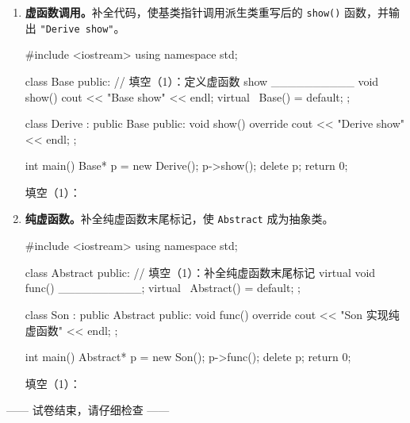 \documentclass[UTF8,fontset=fandol,zihao=-4,a4paper]{ctexart}
\newcommand{\blank}[1][2.4cm]{\underline{\hspace{#1}}}
\newenvironment{questionkeep}
  {\begin{minipage}[t]{\linewidth}}
  {\end{minipage}}
\begin{document}
\begin{enumerate}
  \item
  \begin{questionkeep}
  \textbf{虚函数调用。}补全代码，使基类指针调用派生类重写后的 \texttt{show()} 函数，并输出 \texttt{"Derive show"}。

\begin{cppcode}
#include <iostream>
using namespace std;

class Base {
public:
    // 填空（1）：定义虚函数 show
    __________ void show() {
        cout << "Base show" << endl;
    }
    virtual ~Base() = default;
};

class Derive : public Base {
public:
    void show() override {
        cout << "Derive show" << endl;
    }
};

int main() {
    Base* p = new Derive();
    p->show();
    delete p;
    return 0;
}
\end{cppcode}

  填空（1）：\blank[5cm]
  \end{questionkeep}

  \item
  \begin{questionkeep}
  \textbf{纯虚函数。}补全纯虚函数末尾标记，使 \texttt{Abstract} 成为抽象类。

\begin{cppcode}
#include <iostream>
using namespace std;

class Abstract {
public:
    // 填空（1）：补全纯虚函数末尾标记
    virtual void func() __________;
    virtual ~Abstract() = default;
};

class Son : public Abstract {
public:
    void func() override {
        cout << "Son 实现纯虚函数" << endl;
    }
};

int main() {
    Abstract* p = new Son();
    p->func();
    delete p;
    return 0;
}
\end{cppcode}

  填空（1）：\blank[5cm]
  \end{questionkeep}
\end{enumerate}

\vfill
\begin{center}
  \heiti —— 试卷结束，请仔细检查 ——
\end{center}
\end{document}
